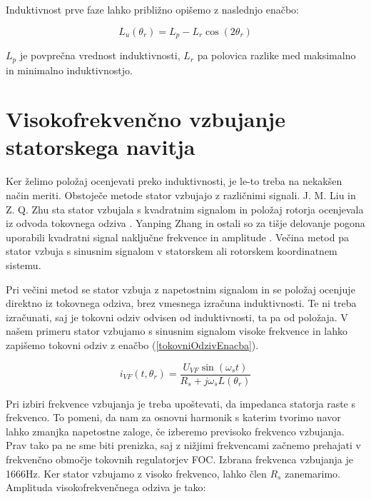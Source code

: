 \documentclass[a4paper,twoside,openright,12pt,slovene]{book}
\begin{document}
Induktivnost prve faze lahko približno opišemo z naslednjo enačbo:

\begin{equation}
    L_u(\theta_r) = L_p - L_r \cos(2\theta_r)
\end{equation}

$L_p$ je povprečna vrednost induktivnosti, $L_r$ pa polovica razlike med maksimalno in minimalno induktivnostjo. 

\section{Visokofrekvenčno vzbujanje statorskega navitja}

Ker želimo položaj ocenjevati preko induktivnosti, je le-to treba na nekakšen način meriti. Obstoječe metode stator vzbujajo z različnimi signali. J. M. Liu in Z. Q. Zhu sta stator vzbujala s
kvadratnim signalom in položaj rotorja ocenjevala iz odvoda tokovnega odziva \cite{6689315}. Yanping Zhang in ostali so za tišje delovanje pogona uporabili kvadratni signal naključne frekvence in
amplitude \cite{8818673}. Večina metod pa stator vzbuja s sinusnim signalom v statorskem \cite{6676793} ali rotorskem \cite{ThreeYearsOfExperience} \cite{8746146} koordinatnem sistemu. 

Pri večini metod se stator vzbuja z napetostnim signalom in se položaj ocenjuje direktno iz tokovnega odziva, brez vmesnega izračuna induktivnosti. Te ni treba izračunati, saj je tokovni odziv
odvisen od induktivnosti, ta pa od položaja. V našem primeru stator vzbujamo s sinusnim signalom visoke frekvence in lahko zapišemo tokovni odziv z enačbo (\ref{tokovniOdzivEnacba}).

\begin{equation} \label{tokovniOdzivEnacba}
    i_{VF}(t,\theta_r) = \frac{U_{VF}\sin(\omega_st)}{R_s + j\omega_sL(\theta_r)}
\end{equation}

Pri izbiri frekvence vzbujanja je treba upoštevati, da impedanca statorja raste s frekvenco. To pomeni, da nam za osnovni harmonik s katerim tvorimo navor lahko zmanjka napetostne zaloge, 
če izberemo previsoko frekvenco vzbujanja. Prav tako pa ne sme biti prenizka, saj z nižjimi frekvencami začnemo prehajati v frekvenčno območje tokovnih regulatorjev FOC. Izbrana frekvenca vzbujanja je 1666Hz.
Ker stator vzbujamo z visoko frekvenco, lahko člen $R_s$ zanemarimo. Amplituda visokofrekvenčnega odziva je tako:
\end{document}
